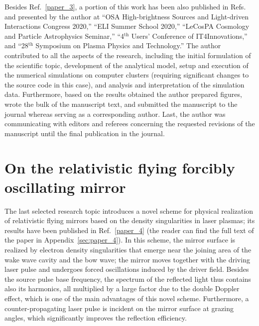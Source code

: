 \documentclass[10pt, a4paper, twoside, openright]{report}
\newcommand{\q}[1]{``#1''} %
\begin{document}
Besides Ref.~\ref{paper_3}, a portion of this work has been also published in Refs.~ and presented by the author at \q{OSA High-brightness Sources and Light-driven Interactions Congress 2020,} \q{ELI Summer School 2020,} \q{LeCosPA Cosmology and Particle Astrophysics Seminar,} \q{4$ ^{\mathrm{th}} $ Users' Conference of IT4Innovations,} and \q{28$ ^{\mathrm{th}} $ Symposium on Plasma Physics and Technology.} The author contributed to all the aspects of the research, including the initial formulation of the scientific topic, development of the analytical model, setup and execution of the numerical simulations on computer clusters (requiring significant changes to the source code in this case), and analysis and interpretation of the simulation data. Furthermore, based on the results obtained the author prepared figures, wrote the bulk of the manuscript text, and submitted the manuscript to the journal whereas serving as a corresponding author. Last, the author was communicating with editors and referees concerning the requested revisions of the manuscript until the final publication in the journal.


\section{On the relativistic flying forcibly oscillating mirror\label{sec:on_the_relativistic_flying_forcibly_oscillating_mirror}}
%

The last selected research topic introduces a novel scheme for physical realization of relativistic flying mirrors based on the density singularities in laser plasmas; its results have been published in Ref.~\ref{paper_4} (the reader can find the full text of the paper in Appendix~\ref{sec:paper_4}). In this scheme, the mirror surface is realized by electron density singularities that emerge near the joining area of the wake wave cavity and the bow wave; the mirror moves together with the driving laser pulse and undergoes forced oscillations induced by the driver field. Besides the source pulse base frequency, the spectrum of the reflected light thus contains also its harmonics, all multiplied by a large factor due to the double Doppler effect, which is one of the main advantages of this novel scheme. Furthermore, a counter-propagating laser pulse is incident on the mirror surface at grazing angles, which significantly improves the reflection efficiency.
\end{document}

